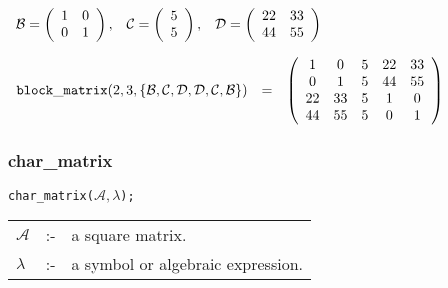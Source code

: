 \begin{flushleft}  
\hspace*{0.1in}
\begin{math}  
\begin{array}{ccc}
{\cal B} = \left( \begin{array}{cc} 1 & 0 \\ 0 & 1
\end{array} \right), & 
{\cal C} = \left( \begin{array}{c} 5 \\ 5
\end{array} \right), &
{\cal D} = \left( \begin{array}{cc} 22 & 33 \\ 44 & 55
\end{array} \right) 
\end{array}
\end{math}  
\end{flushleft}

\vspace*{0.175in}

\begin{flushleft}  
\hspace*{0.1in}
\begin{math}  
\begin{array}{ccc}
{\tt block\_matrix}(2,3,\{{\cal B,C,D,D,C,B}\}) & = & 
\left( \begin{array}{ccccc} 1 & 0 & 5 & 22 & 33 \\ 0 & 1 & 5 & 44 & 55 
\\
22 & 33 & 5 & 1 & 0 \\ 44 & 55 & 5 & 0 & 1
\end{array} \right)  
\end{array}  
\end{math}  
\end{flushleft}


\subsubsection{char\_matrix}
\label{linalg:char_matrix}


\hspace*{0.175in} {\tt char\_matrix($\mathcal{A},\lambda$);}

\hspace*{0.1in} 
\begin{tabular}{l l l}
$\mathcal{A}$ &:-& a square matrix. \\
$\lambda$  &:-& a symbol or algebraic expression. 
\end{tabular}

